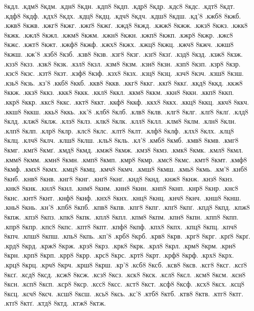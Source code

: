 {8кдл.
.кдм8
8кдм.
.кдн8
8кдн.
.кдп8
8кдп.
.кдр8
8кдр.
.кдс8
8кдс.
.кдт8
8кдт.
.кдф8
8кдф.
.кдх8
8кдх.
.кдц8
8кдц.
.кдч8
8кдч.
.кдш8
8кдш.
.кд'8
.кжб8
8кжб.
.кжв8
8кжв.
.кжг8
8кжг.
.кжґ8
8кжґ.
.кжд8
8кжд.
.кжж8
8кжж.
.кжз8
8кжз.
.кжк8
8кжк.
.кжл8
8кжл.
.кжм8
8кжм.
.кжн8
8кжн.
.кжп8
8кжп.
.кжр8
8кжр.
.кжс8
8кжс.
.кжт8
8кжт.
.кжф8
8кжф.
.кжх8
8кжх.
.кжц8
8кжц.
.кжч8
8кжч.
.кжш8
8кжш.
.кж'8
.кзб8
8кзб.
.кзв8
8кзв.
.кзг8
8кзг.
.кзґ8
8кзґ.
.кзд8
8кзд.
.кзж8
8кзж.
.кзз8
8кзз.
.кзк8
8кзк.
.кзл8
8кзл.
.кзм8
8кзм.
.кзн8
8кзн.
.кзп8
8кзп.
.кзр8
8кзр.
.кзс8
8кзс.
.кзт8
8кзт.
.кзф8
8кзф.
.кзх8
8кзх.
.кзц8
8кзц.
.кзч8
8кзч.
.кзш8
8кзш.
.кзь8
8кзь.
.кз'8
.ккб8
8ккб.
.ккв8
8ккв.
.ккг8
8ккг.
.ккґ8
8ккґ.
.ккд8
8ккд.
.ккж8
8ккж.
.ккз8
8ккз.
.ккк8
8ккк.
.ккл8
8ккл.
.ккм8
8ккм.
.ккн8
8ккн.
.ккп8
8ккп.
.ккр8
8ккр.
.ккс8
8ккс.
.ккт8
8ккт.
.ккф8
8ккф.
.ккх8
8ккх.
.ккц8
8ккц.
.ккч8
8ккч.
.ккш8
8ккш.
.ккь8
8ккь.
.кк'8
.клб8
8клб.
.клв8
8клв.
.клг8
8клг.
.клґ8
8клґ.
.клд8
8клд.
.клж8
8клж.
.клз8
8клз.
.клк8
8клк.
.клл8
8клл.
.клм8
8клм.
.клн8
8клн.
.клп8
8клп.
.клр8
8клр.
.клс8
8клс.
.клт8
8клт.
.клф8
8клф.
.клх8
8клх.
.клц8
8клц.
.клч8
8клч.
.клш8
8клш.
.кль8
8кль.
.кл'8
.кмб8
8кмб.
.кмв8
8кмв.
.кмг8
8кмг.
.кмґ8
8кмґ.
.кмд8
8кмд.
.кмж8
8кмж.
.кмз8
8кмз.
.кмк8
8кмк.
.кмл8
8кмл.
.кмм8
8кмм.
.кмн8
8кмн.
.кмп8
8кмп.
.кмр8
8кмр.
.кмс8
8кмс.
.кмт8
8кмт.
.кмф8
8кмф.
.кмх8
8кмх.
.кмц8
8кмц.
.кмч8
8кмч.
.кмш8
8кмш.
.кмь8
8кмь.
.км'8
.кнб8
8кнб.
.кнв8
8кнв.
.кнг8
8кнг.
.кнґ8
8кнґ.
.кнд8
8кнд.
.кнж8
8кнж.
.кнз8
8кнз.
.кнк8
8кнк.
.кнл8
8кнл.
.кнм8
8кнм.
.кнн8
8кнн.
.кнп8
8кнп.
.кнр8
8кнр.
.кнс8
8кнс.
.кнт8
8кнт.
.кнф8
8кнф.
.кнх8
8кнх.
.кнц8
8кнц.
.кнч8
8кнч.
.кнш8
8кнш.
.кнь8
8кнь.
.кн'8
.кпб8
8кпб.
.кпв8
8кпв.
.кпг8
8кпг.
.кпґ8
8кпґ.
.кпд8
8кпд.
.кпж8
8кпж.
.кпз8
8кпз.
.кпк8
8кпк.
.кпл8
8кпл.
.кпм8
8кпм.
.кпн8
8кпн.
.кпп8
8кпп.
.кпр8
8кпр.
.кпс8
8кпс.
.кпт8
8кпт.
.кпф8
8кпф.
.кпх8
8кпх.
.кпц8
8кпц.
.кпч8
8кпч.
.кпш8
8кпш.
.кпь8
8кпь.
.кп'8
.крб8
8крб.
.крв8
8крв.
.крг8
8крг.
.крґ8
8крґ.
.крд8
8крд.
.крж8
8крж.
.крз8
8крз.
.крк8
8крк.
.крл8
8крл.
.крм8
8крм.
.крн8
8крн.
.крп8
8крп.
.крр8
8крр.
.крс8
8крс.
.крт8
8крт.
.крф8
8крф.
.крх8
8крх.
.крц8
8крц.
.крч8
8крч.
.крш8
8крш.
.кр'8
.ксб8
8ксб.
.ксв8
8ксв.
.ксг8
8ксг.
.ксґ8
8ксґ.
.ксд8
8ксд.
.ксж8
8ксж.
.ксз8
8ксз.
.кск8
8кск.
.ксл8
8ксл.
.ксм8
8ксм.
.ксн8
8ксн.
.ксп8
8ксп.
.кср8
8кср.
.ксс8
8ксс.
.кст8
8кст.
.ксф8
8ксф.
.ксх8
8ксх.
.ксц8
8ксц.
.ксч8
8ксч.
.ксш8
8ксш.
.ксь8
8ксь.
.кс'8
.ктб8
8ктб.
.ктв8
8ктв.
.ктг8
8ктг.
.ктґ8
8ктґ.
.ктд8
8ктд.
.ктж8
8ктж.
}

